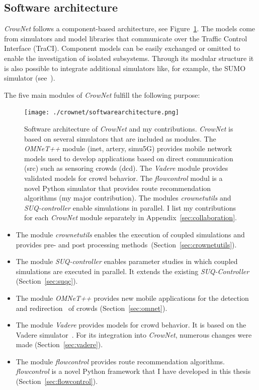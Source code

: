 \subsection{Software architecture}
\textit{CrowNet} follows a component-based architecture, see Figure~\ref{fig:architecture}. The models come from simulators and model libraries that communicate over the Traffic Control Interface (TraCI). Component models can be easily exchanged or omitted to enable the investigation of isolated subsystems. Through its modular structure it is also possible to integrate additional simulators like, for example, the SUMO simulator (see~\cite{rupp-2021-com}). 

The five main modules of \textit{CrowNet} fulfill the following purpose:




\begin{figure}[hbt!]
\texttt{[image: ./crownet/softwarearchitecture.png]} 
\caption[Software architecture of CrowNet and my contributions]{Software architecture of \textit{CrowNet} and my contributions. \textit{CrowNet} is based on several simulators that are included as modules. The \textit{OMNeT++} module (inet, artery, simu5G) provides mobile network models used to develop applications based on direct communication (src) such as sensoring crowds (dcd). The \textit{Vadere} module provides validated models for crowd behavior. The \textit{flowcontrol} modul is a novel Python simulator that provides route recommendation algorithms (my major contribution). The modules \textit{crownetutils} and \textit{SUQ-controller} enable simulations in parallel. I list my contributions for each \textit{CrowNet} module separately in Appendix~\ref{sec:collaboration}.}
\label{fig:architecture}
\end{figure}



\begin{itemize}
\item The module \textit{crownetutils} enables the execution of coupled simulations and provides pre- and post processing  methods~(Section~\ref{sec:crownetutils}).
\item The module  \textit{SUQ-controller} enables parameter studies in which coupled simulations are executed in parallel. It extends the existing \textit{SUQ-Controller} (Section~\ref{sec:suqc}).
\item The module  \textit{OMNeT++} provides new mobile applications for the detection~\cite{schuhbaeck-2021-com,schuhbaeck-2023-com} and redirection~\cite{mayr-2021-com} of crowds (Section~\ref{sec:omnet}). 
\item The module  \textit{Vadere} provides models for crowd behavior. It is based on the Vadere simulator~\cite{kleinmeier-2019-cdyn}. For its integration into \textit{CrowNet}, numerous changes were made (Section~\ref{sec:vadere}).
\item The module \textit{flowcontrol} provides route recommendation algorithms. \textit{flowcontrol} is a novel Python framework that I have developed in this thesis (Section~\ref{sec:flowcontrol}).
\end{itemize}







